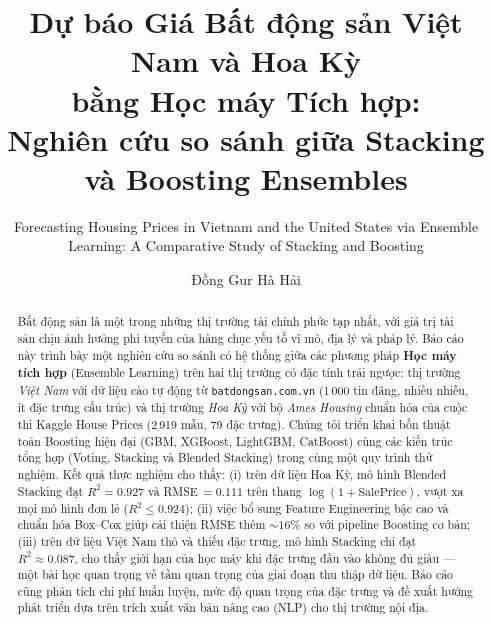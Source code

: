 \documentclass[sigconf,nonacm]{acmart}
\begin{document}
\title{Dự báo Giá Bất động sản Việt Nam và Hoa Kỳ\\
       bằng Học máy Tích hợp:\\
       Nghiên cứu so sánh giữa Stacking và Boosting Ensembles}

\subtitle{Forecasting Housing Prices in Vietnam and the United States via
          Ensemble Learning: A Comparative Study of Stacking and Boosting}

\author{Đồng Gur Hà Hải}

\begin{abstract}
Bất động sản là một trong những thị trường tài chính phức tạp nhất, với
giá trị tài sản chịu ảnh hưởng phi tuyến của hàng chục yếu tố vĩ mô,
địa lý và pháp lý. Báo cáo này trình bày một nghiên cứu so sánh có hệ
thống giữa các phương pháp \textbf{Học máy tích hợp} (Ensemble Learning)
trên hai thị trường có đặc tính trái ngược: thị trường \emph{Việt Nam}
với dữ liệu cào tự động từ \texttt{batdongsan.com.vn} (1\,000 tin đăng,
nhiều nhiễu, ít đặc trưng cấu trúc) và thị trường \emph{Hoa Kỳ} với bộ
\emph{Ames Housing} chuẩn hóa của cuộc thi Kaggle House Prices
(2\,919 mẫu, 79 đặc trưng). Chúng tôi triển khai bốn thuật toán Boosting
hiện đại (GBM, XGBoost, LightGBM, CatBoost) cùng các kiến trúc tổng hợp
(Voting, Stacking và Blended Stacking) trong cùng một quy trình thử
nghiệm. Kết quả thực nghiệm cho thấy: (i) trên dữ liệu Hoa Kỳ, mô hình
Blended Stacking đạt $R^2 = 0{.}927$ và RMSE\,$=0{.}111$ trên thang
$\log(1+\text{SalePrice})$, vượt xa mọi mô hình đơn lẻ
($R^2 \le 0{.}924$); (ii) việc bổ sung Feature Engineering bậc cao và
chuẩn hóa Box--Cox giúp cải thiện RMSE thêm $\sim 16\%$ so với pipeline
Boosting cơ bản; (iii) trên dữ liệu Việt Nam thô và thiếu đặc trưng,
mô hình Stacking chỉ đạt $R^2 \approx 0{.}087$, cho thấy giới hạn của
học máy khi đặc trưng đầu vào không đủ giàu --- một bài học quan trọng
về tầm quan trọng của giai đoạn thu thập dữ liệu. Báo cáo cũng phân
tích chi phí huấn luyện, mức độ quan trọng của đặc trưng và đề xuất
hướng phát triển dựa trên trích xuất văn bản nâng cao (NLP) cho thị
trường nội địa.
\end{abstract}
\end{document}
